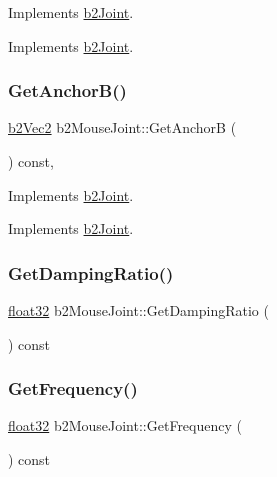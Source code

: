 Implements \mbox{\hyperlink{classb2_joint}{b2\+Joint}}. 



Implements \mbox{\hyperlink{classb2_joint_abe46ca3aad5db73909a9b5a7b2117447}{b2\+Joint}}.

\mbox{\label{classb2_mouse_joint_adecfaff123ba199f9fc80be7fcb74af2}} 
\subsubsection{\texorpdfstring{GetAnchorB()}{GetAnchorB()}}
{\footnotesize\ttfamily \mbox{\hyperlink{structb2_vec2}{b2\+Vec2}} b2\+Mouse\+Joint\+::\+Get\+AnchorB (\begin{DoxyParamCaption}{ }\end{DoxyParamCaption}) const\hspace{0.3cm}{\ttfamily [override]}, {\ttfamily [virtual]}}



Implements \mbox{\hyperlink{classb2_joint}{b2\+Joint}}. 



Implements \mbox{\hyperlink{classb2_joint_a88e947c65d4ea26fe539f02a8cb7f7a9}{b2\+Joint}}.

\mbox{\label{classb2_mouse_joint_a551de1d56a743e71684a1382054c17c9}} 
\subsubsection{\texorpdfstring{GetDampingRatio()}{GetDampingRatio()}}
{\footnotesize\ttfamily \mbox{\hyperlink{b2_settings_8h_aacdc525d6f7bddb3ae95d5c311bd06a1}{float32}} b2\+Mouse\+Joint\+::\+Get\+Damping\+Ratio (\begin{DoxyParamCaption}{ }\end{DoxyParamCaption}) const}

\mbox{\label{classb2_mouse_joint_a97b9264cc357ac96e447990f52086719}} 
\subsubsection{\texorpdfstring{GetFrequency()}{GetFrequency()}}
{\footnotesize\ttfamily \mbox{\hyperlink{b2_settings_8h_aacdc525d6f7bddb3ae95d5c311bd06a1}{float32}} b2\+Mouse\+Joint\+::\+Get\+Frequency (\begin{DoxyParamCaption}{ }\end{DoxyParamCaption}) const}

